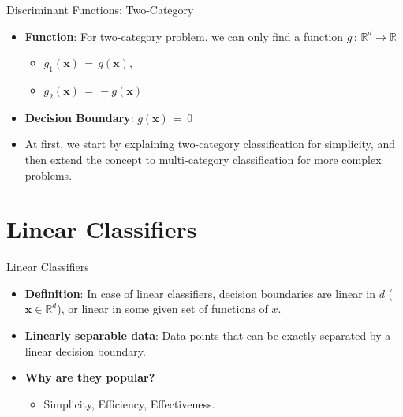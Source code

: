 \documentclass[serif, aspectratio=169]{beamer}
\begin{document}
\begin{frame}{Discriminant Functions: Two-Category}
    \begin{itemize}\itemsep1.5em
        \item \justifying \textbf{Function}: For two-category problem, we can only find a function $g \, : \, \mathbb{R}^d \rightarrow \mathbb{R}$
        \begin{itemize}
            \item $g_1(\mathbf{x}) \, = \, g(\mathbf{x})$,
            \item $g_2(\mathbf{x}) \, = \, -g(\mathbf{x})$
        \end{itemize}
        \item \textbf{Decision Boundary}: $g(\mathbf{x}) \, = \, 0$
        \item \justifying At first, we start by explaining two-category classification for simplicity, and then extend the concept to multi-category classification for more complex problems.
    \end{itemize}
\end{frame}


\section{Linear Classifiers}

\begin{frame}{Linear Classifiers}
    \begin{itemize}\itemsep1.5em
        \item \justifying \textbf{Definition}: In case of linear classifiers, decision boundaries are linear in $d$ (\(\mathbf{x} \in \mathbb{R}^d\)), or linear in some given set of functions of $x$.
        \item \justifying \textbf{Linearly separable data}: Data points that can be exactly separated by a linear decision boundary.
        \item \textbf{Why are they popular?}
        \smallskip
        \begin{itemize}
            \item \justifying Simplicity, Efficiency, Effectiveness.
        \end{itemize}
    \end{itemize}
\end{frame}
\end{document}
